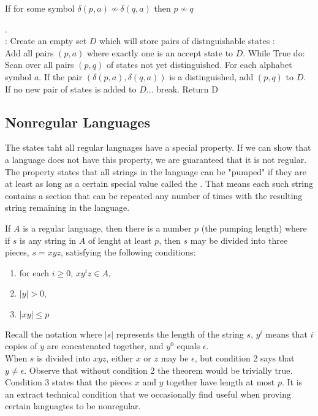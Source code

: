 \documentclass{article}
\begin{document}
\begin{lemma}
  If for some symbol $\delta(p,a) \not\sim \delta(q,a)$ then $p \not\sim q$
\end{lemma}

\begin{definition}. \\
  : Create an empty set $D$ which will store pairs of distnguishable states 
  : \\ 
  Add all pairs $(p,a)$ where exactly one is an accept state to $D$. While True do: Scan over all pairs $(p,q)$ of states not yet distinguished. For each alphabet symbol $a$. If the pair $(\delta(p,a),\delta(q,a))$ is a distinguished, add $(p,q)$ to $D$. If no new pair of states is added to $D\dots$ break. Return D
\end{definition}

\subsection{Nonregular Languages}

The  states taht all regular languages have a special property. If we can show that a language does not have this property, we are guaranteed that it is not regular. The property states that all strings in the language can be "pumped" if they are at least as long as a certain special value called the . That means each such string contains a section that can be repeated any number of times with the resulting string remaining in the language. 
\begin{theorem}
  If $A$ is a regular language, then there is a number $p$ (the pumping length) where if $s$ is any string in $A$ of lenght at least $p$, then $s$ may be divided into three pieces, $s=xyz$, satisfying the following conditions: 
  \begin{enumerate}
    \item for each $i \geq 0$, $xy^{i}z \in A$, 
    \item $|y| > 0$, 
    \item $|xy| \leq p$
  \end{enumerate}
  Recall the notation where $|s|$ represents the length of the string $s$, $y^i$ means that $i$ copies of $y$ are concatenated together, and $y^0$ equals $\epsilon$. \\

  When $s$ is divided into $xyz$, either $x$ or $z$ may be $\epsilon$, but condition 2 says that $y \neq \epsilon$. Observe that without condition 2 the theorem would be trivially true. Condition 3 states that the pieces $x$ and $y$ together have length at most $p$. It is an extract technical condition that we occasionally find useful when proving certain languagtes to be nonregular. 
\end{theorem}
\end{document}

